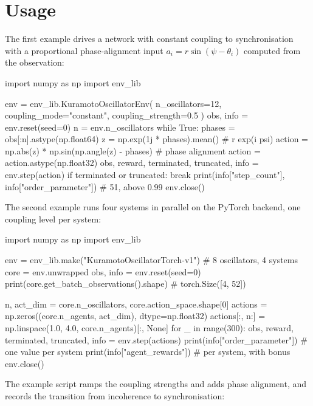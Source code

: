 \section{Usage}\label{sec:kuramoto-usage}

The first example drives a network with constant coupling to synchronisation
with a proportional phase-alignment input $a_i = r \sin(\psi - \theta_i)$
computed from the observation:

\begin{pycode}
import numpy as np
import env_lib

env = env_lib.KuramotoOscillatorEnv(
    n_oscillators=12, coupling_mode="constant", coupling_strength=0.5
)
obs, info = env.reset(seed=0)
n = env.n_oscillators
while True:
    phases = obs[:n].astype(np.float64)
    z = np.exp(1j * phases).mean()                      # r exp(i psi)
    action = np.abs(z) * np.sin(np.angle(z) - phases)   # phase alignment
    action = action.astype(np.float32)
    obs, reward, terminated, truncated, info = env.step(action)
    if terminated or truncated:
        break
print(info["step_count"], info["order_parameter"])   # 51, above 0.99
env.close()
\end{pycode}

The second example runs four systems in parallel on the PyTorch backend, one
coupling level per system:

\begin{pycode}
import numpy as np
import env_lib

env = env_lib.make("KuramotoOscillatorTorch-v1")   # 8 oscillators, 4 systems
core = env.unwrapped
obs, info = env.reset(seed=0)
print(core.get_batch_observations().shape)         # torch.Size([4, 52])

n, act_dim = core.n_oscillators, core.action_space.shape[0]
actions = np.zeros((core.n_agents, act_dim), dtype=np.float32)
actions[:, n:] = np.linspace(1.0, 4.0, core.n_agents)[:, None]
for _ in range(300):
    obs, reward, terminated, truncated, info = env.step(actions)
print(info["order_parameter"])                     # one value per system
print(info["agent_rewards"])                       # per system, with bonus
env.close()
\end{pycode}

The example script  ramps the coupling
strengths and adds phase alignment, and records the transition from incoherence
to synchronisation:


